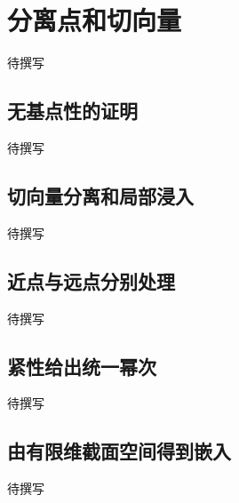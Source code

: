 
% 
% 

\section{分离点和切向量}
\label{g4:sec:1904}

待撰写

\subsection{无基点性的证明}
\label{g4:subsec:1904:01}
待撰写

\subsection{切向量分离和局部浸入}
\label{g4:subsec:1904:02}
待撰写

\subsection{近点与远点分别处理}
\label{g4:subsec:1904:03}
待撰写

\subsection{紧性给出统一幂次}
\label{g4:subsec:1904:04}
待撰写

\subsection{由有限维截面空间得到嵌入}
\label{g4:subsec:1904:05}
待撰写
